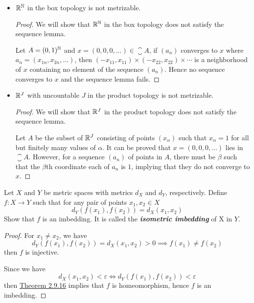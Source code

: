 \documentclass[12pt,a4paper]{article}
\begin{document}
    \begin{eg}\hfill
        \begin{itemize}
            \item $\mathbb{R}^{\mathbb{N}}$ in the box topology is not metrizable.
            \begin{proof}
                We will show that $\mathbb{R}^{\mathbb{N}}$ in the box topology does not satisfy the sequence lemma.

                Let $A=(0,1)^{\mathbb{N}}$ and $x=(0,0,0,\dots)\in\closure{A}$, if $(a_n)$ converges to $x$ where $a_n=(x_{1n},x_{2n},\dots)$, then $(-x_{11},x_{11})\times(-x_{22},x_{22})\times\cdots$ is a neighborhood of $x$ containing no element of the sequence $(a_n)$. Hence no sequence converges to $x$ and the sequence lemma fails.
            \end{proof}
            \item $\mathbb{R}^J$ with uncountable $J$ in the product topology is not metrizable.
            \begin{proof}
                We will show that $\mathbb{R}^J$ in the product topology does not satisfy the sequence lemma.

                Let $A$ be the subset of $\mathbb{R}^J$ consisting of points $(x_\alpha)$ such that $x_\alpha=1$ for all but finitely many values of $\alpha$. It can be proved that $x=(0,0,0,\dots)$ lies in $\closure{A}$. However, for a sequence $(a_n)$ of points in $A$, there must be $\beta$ such that the $\beta$th coordinate each of $a_n$ is $1$, implying that they do not converge to $x$. 
            \end{proof}
        \end{itemize}        
    \end{eg}
    \hfill
    
    \begin{ex}
        Let $X$ and $Y$ be metric spaces with metrics $d_X$ and $d_Y$, respectively. Define $f:X\to Y$ such that for any pair of points $x_1,x_2\in X$
        $$
        d_Y(f(x_1),f(x_2))=d_X(x_1,x_2)
        $$
        Show that $f$ is an imbedding. It is called the \textit{\textbf{isometric imbedding}} of X in $Y$.
    \end{ex}
    \begin{proof}
        For $x_1\neq x_2$, we have
        $$
        d_Y(f(x_1),f(x_2))=d_X(x_1,x_2)>0\implies f(x_1)\neq f(x_2)
        $$
        then $f$ is injective.

        Since we have
        $$
        d_X(x_1,x_2)<\varepsilon\iff d_Y(f(x_1),f(x_2))<\varepsilon
        $$
        then \hyperref[2.9.16]{Theorem 2.9.16} implies that $f$ is homeomorphism, hence $f$ is an imbedding. 
    \end{proof}
    \hfill
\end{document}
